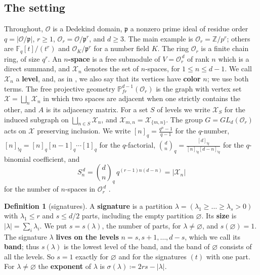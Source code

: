 \documentclass[11pt]{article}
\numberwithin{equation}{section}
\theoremstyle{plain}
\theoremstyle{definition}
\newtheorem*{definition*}{Definition}
\begin{document}
\subsection{The setting}\label{sec:1.1}

Throughout, $\mathcal{O}$ is a Dedekind domain, $\mathfrak{p}$ a nonzero prime ideal
of residue order $q=|\mathcal{O}/\mathfrak{p}|$, $r\ge1$,
$\mathcal{O}_r=\mathcal{O}/\mathfrak{p}^r$, and $d\ge3$. The main example is
$\mathcal{O}_r=\mathbb{Z}/p^r$; others are $\mathbb{F}_q[t]/(t^r)$ and
$\mathcal{O}_K/\mathfrak{p}^r$ for a number field $K$. The ring $\mathcal{O}_r$ is
a finite chain ring, of size $q^r$. An
\textbf{$n$-space} is a free submodule of $V=\mathcal{O}_r^{\,d}$ of rank $n$ which is a direct
summand, and $\mathcal{X}_n$ denotes the set of $n$-spaces, for $1\le n\le d-1$. We call $\mathcal{X}_n$ a
\textbf{level}, and, as in \cite{LP25}, we also say that its vertices have \textbf{color} $n$; we use
both terms. The free projective geometry $\mathbb{P}^{d-1}_{fr}(\mathcal{O}_r)$ is the graph with
vertex set $\mathcal{X}=\bigsqcup_n\mathcal{X}_n$ in which two spaces are adjacent when one strictly
contains the other, and $A$ is its adjacency matrix. For a set $S$ of levels we write
$\mathcal{X}_S$ for the induced subgraph on $\bigsqcup_{n\in S}\mathcal{X}_n$, and
$\mathcal{X}_{m,n}=\mathcal{X}_{\{m,n\}}$. The group $G=GL_d(\mathcal{O}_r)$ acts on
$\mathcal{X}$ preserving inclusion. We write $[n]_q=\frac{q^n-1}{q-1}$ for the $q$-number,
$[n]_{!q}=[n]_q[n-1]_q\cdots[1]_q$ for the $q$-factorial,
$\binom dn_q=\frac{[d]_{!q}}{[n]_{!q}[d-n]_{!q}}$ for the $q$-binomial coefficient, and
\begin{equation}\label{eq:1.1}
S^{\,d}_{n}=\binom{d}{n}_q\,q^{(r-1)n(d-n)}=|\mathcal{X}_n|
\end{equation}
for the number of $n$-spaces in $\mathcal{O}_r^{\,d}$ \cite[Prop. 2.2]{LP25}.

\begin{definition*}[signatures]
A \textbf{signature} is a partition
$\lambda=(\lambda_1\ge\dots\ge\lambda_s>0)$ with $\lambda_1\le r$ and
$s\le d/2$ parts, including the empty partition $\varnothing$. Its
\textbf{size} is $|\lambda|=\sum_i\lambda_i$. We put $s=s(\lambda)$, the number of parts,
for $\lambda\ne\varnothing$, and $s(\varnothing)=1$. The signature $\lambda$
\textbf{lives on the levels} $n=s,s+1,\dots,d-s$, which we call its \textbf{band}; thus
$s(\lambda)$ is the lowest level of the band, and the band of $\varnothing$ consists of
all the levels. So $s=1$ exactly for $\varnothing$ and for the signatures $(t)$ with one part. For $\lambda\ne\varnothing$ the \textbf{exponent} of $\lambda$ is
$\sigma(\lambda)\coloneqq 2rs-|\lambda|$.

\end{definition*}
\end{document}
